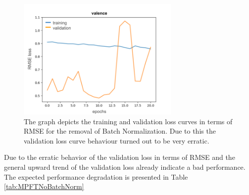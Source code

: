 \begin{figure}[H]
  \begin{center}
  \includegraphics[angle=0, width=0.7\textwidth]{Figures/Plot_AblationStudy_BatchNorm.png}
  \caption[Ablation study: BatchNormalization loss curve]{The graph depicts the training and validation loss curves in terms of RMSE for the removal of Batch Normalization. Due to this the validation loss curve behaviour turned out to be very erratic.}
  \label{fig:AblationNoBatchNorm}
  \end{center}
\end{figure}         

Due to the erratic behavior of the validation loss in terms of RMSE and the general upward trend of the validation loss already indicate a bad performance. The expected performance degradation is presented in Table \ref{tab:MPFTNoBatchNorm}

